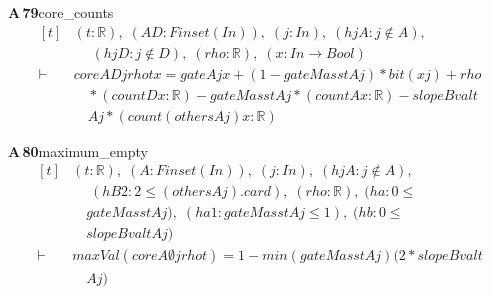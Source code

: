 \documentclass[conference]{IEEEtran}
\theoremstyle{definition}
\newcommand{\lean}[1]{\textsf{\footnotesize #1}}
\begin{document}
\noindent\textbf{A\,79}\quad\lean{core\_counts}
{\footnotesize\[ \begin{aligned}[t]
&(\mathit{t} : \mathbb{R} ),\; (\mathit{A} \mathit{D} : \mathit{Finset} (\mathit{I} \mathit{n})),\; (\mathit{j} : \mathit{I} \mathit{n}),\; (\mathit{hjA} : \mathit{j} \notin \mathit{A}),\\
&\quad \; (\mathit{hjD} : \mathit{j} \notin \mathit{D}),\; (\mathit{rho} : \mathbb{R} ),\; (\mathit{x} : \mathit{I} \mathit{n} \to \mathit{Bool})\\
\vdash\;&\mathit{core} \mathit{A} \mathit{D} \mathit{j} \mathit{rho} \mathit{t} \mathit{x} = \mathit{gate} \mathit{A} \mathit{j} \mathit{x}+(1-\mathit{gateMass} \mathit{t} \mathit{A} \mathit{j})*\mathit{bit} (\mathit{x} \mathit{j}) +\mathit{rho}\\
&\quad *(\mathit{count} \mathit{D} \mathit{x} : \mathbb{R} )-\mathit{gateMass} \mathit{t} \mathit{A} \mathit{j}*(\mathit{count} \mathit{A} \mathit{x} : \mathbb{R} ) -\mathit{slopeBval} \mathit{t}\\
&\quad \mathit{A} \mathit{j}*(\mathit{count} (\mathit{others} \mathit{A} \mathit{j}) \mathit{x} : \mathbb{R} )
\end{aligned} \]}

\noindent\textbf{A\,80}\quad\lean{maximum\_empty}
{\footnotesize\[ \begin{aligned}[t]
&(\mathit{t} : \mathbb{R} ),\; (\mathit{A} : \mathit{Finset} (\mathit{I} \mathit{n})),\; (\mathit{j} : \mathit{I} \mathit{n}),\; (\mathit{hjA} : \mathit{j} \notin \mathit{A}),\\
&\quad \; (\mathit{hB2} : 2 \leq (\mathit{others} \mathit{A} \mathit{j}).\mathit{card}),\; (\mathit{rho} : \mathbb{R} ),\; (\mathit{ha} : 0 \leq\\
&\quad \mathit{gateMass} \mathit{t} \mathit{A} \mathit{j}),\; (\mathit{ha1} : \mathit{gateMass} \mathit{t} \mathit{A} \mathit{j} \leq 1),\; (\mathit{hb} : 0 \leq\\
&\quad \mathit{slopeBval} \mathit{t} \mathit{A} \mathit{j})\\
\vdash\;&\mathit{maxVal} (\mathit{core} \mathit{A} \emptyset \mathit{j} \mathit{rho} \mathit{t}) = 1-\mathit{min} (\mathit{gateMass} \mathit{t} \mathit{A} \mathit{j}) (2*\mathit{slopeBval} \mathit{t}\\
&\quad \mathit{A} \mathit{j})
\end{aligned} \]}
\end{document}
